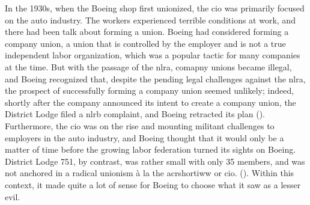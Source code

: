 \documentclass[12pt]{article}
\begin{document}
In the 1930s, when the Boeing shop first unionized, the \acrshort{cio} was primarily focused on the auto industry. The workers experienced terrible conditions at work, and there had been talk about forming a union. Boeing had considered forming a company union, a union that is controlled by the employer and is not a true independent labor organization, which was a popular tactic for many companies at the time. But with the passage of the \acrshort{nlra}, comapny unions became illegal, and Boeing recognized that, despite the pending legal challenges against the \acrshort{nlra}, the prospect of successfully forming a company union seemed unlikely; indeed, shortly after the company announced its intent to create a company union, the District Lodge filed a \acrshort{nlrb} complaint, and Boeing retracted its plan (\cite[23-24]{mccannBloodWaterHistory1989}). Furthermore, the \acrshort{cio} was on the rise and mounting militant challenges to employers in the auto industry, and Boeing thought that it would only be a matter of time before the growing labor federation turned its sights on Boeing. District Lodge 751, by contrast, was rather small with only 35 members, and was not anchored in a radical unionism \`{a} la the acrshort{iww} or \acrshort{cio}. (\cite[24]{mccannBloodWaterHistory1989}). Within this context, it made quite a lot of sense for Boeing to choose what it saw as a lesser evil.


\end{document}
